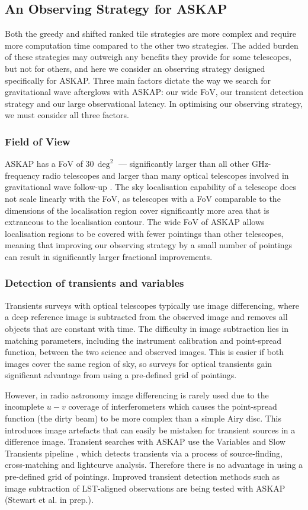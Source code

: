 \subsection{An Observing Strategy for ASKAP}
Both the greedy and shifted ranked tile strategies are more complex and require more computation time compared to the other two strategies. The added burden of these strategies may outweigh any benefits they provide for some telescopes, but not for others, and here we consider an observing strategy designed specifically for ASKAP. Three main factors dictate the way we search for gravitational wave afterglows with ASKAP: our wide FoV, our transient detection strategy and our large observational latency. In optimising our observing strategy, we must consider all three factors.

\subsubsection{Field of View}
ASKAP has a FoV of $30\,\deg^{2}$ --- significantly larger than all other GHz-frequency radio telescopes and larger than many optical telescopes involved in gravitational wave follow-up \citep{2017ApJ...848L..12A}. The sky localisation capability of a telescope does not scale linearly with the FoV, as telescopes with a FoV comparable to the dimensions of the localisation region cover significantly more area that is extraneous to the localisation contour. The wide FoV of ASKAP allows localisation regions to be covered with fewer pointings than other telescopes, meaning that improving our observing strategy by a small number of pointings can result in significantly larger fractional improvements.

\subsubsection{Detection of transients and variables}
Transients surveys with optical telescopes typically use image differencing, where a deep reference image is subtracted from the observed image and removes all objects that are constant with time. The difficulty in image subtraction lies in matching parameters, including the instrument calibration and point-spread function, between the two science and observed images. This is easier if both images cover the same region of sky, so surveys for optical transients gain significant advantage from using a pre-defined grid of pointings.

However, in radio astronomy image differencing is rarely used due to the incomplete $u-v$ coverage of interferometers which causes the point-spread function (the dirty beam) to be more complex than a simple Airy disc. This introduces image artefacts that can easily be mistaken for transient sources in a difference image. Transient searches with ASKAP use the Variables and Slow Transients pipeline \citep{2013PASA...30....6M}, which detects transients via a process of source-finding, cross-matching and lightcurve analysis. Therefore there is no advantage in using a pre-defined grid of pointings. Improved transient detection methods such as image subtraction of LST-aligned observations are being tested with ASKAP (Stewart et al. in prep.).

